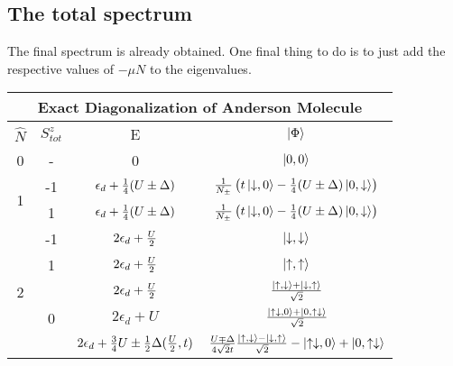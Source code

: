 \documentclass[12pt]{article}
\begin{document}
\subsection{The total spectrum}
The final spectrum is already obtained. One final thing to do is to just add the respective values of \(-\mu N\) to the eigenvalues.
\begin{table}
\begin{center}
\begin{tabular}{@{}cccc@{}}
\toprule
\multicolumn{4}{c}{\bf{Exact Diagonalization of Anderson Molecule}} \\
\toprule
\(\hat{N}\) & \(S_{tot}^z\) & E & \(\ket{\Phi}\)\\
\toprule
0 & - & 0 & \(\ket{0,0}\) \\ \toprule
\multirow{2}{*}{1} & -1 & \(\epsilon_d + \frac{1}{4}(U\pm\Delta)\)  & \(\frac{1}{N_\pm}\left({t\ket{\downarrow,0}-\frac{1}{4}(U\pm\Delta)\ket{0,\downarrow}}\right)\) \\

 \cmidrule(l){2-4}

& 1 & \(\epsilon_d + \frac{1}{4}(U\pm\Delta)\)  & \(\frac{1}{N_\pm}\left({t\ket{\downarrow,0}-\frac{1}{4}(U\pm\Delta)\ket{0,\downarrow}}\right)\) \\
 \toprule

\multirow{6}{*}{2}                     & -1                  & \(2\epsilon_d+\frac{U}{2}\)   & \(\ket{\downarrow,\downarrow}\)  \\
 \cmidrule(l){2-4} 
                                       & 1                   & \(2\epsilon_d+\frac{U}{2}\)   & \(\ket{\uparrow,\uparrow}\) \\
                                       \cmidrule(l){2-4} 
                                       & \multirow{3}{*}{0}  & \(2\epsilon_d+\frac{U}{2}\)   & \(\frac{\ket{\uparrow,\downarrow}+\ket{\downarrow,\uparrow}}{\sqrt{2}}\)  \\
                                        \cmidrule(l){3-4} 

                                       &                     & \(2\epsilon_d+U\)  & \(\frac{\ket{\uparrow\downarrow,0}+\ket{0,\uparrow\downarrow}}{\sqrt{2}}\)  \\
                                        \cmidrule(l){3-4} 

                                       &                     & \(2\epsilon_d+\frac{3}{4}U\pm\frac{1}{2}\Delta(\frac{U}{2},t)\)    & \(\frac{U\mp\Delta}{4\sqrt{2}t}\frac{\ket{\uparrow,\downarrow} - \ket{\downarrow,\uparrow}}{\sqrt 2}-\ket{\uparrow\downarrow,0} + \ket{0,\uparrow\downarrow}\)  \\
                                     

\end{tabular}
\end{center}
\end{table}
\end{document}
